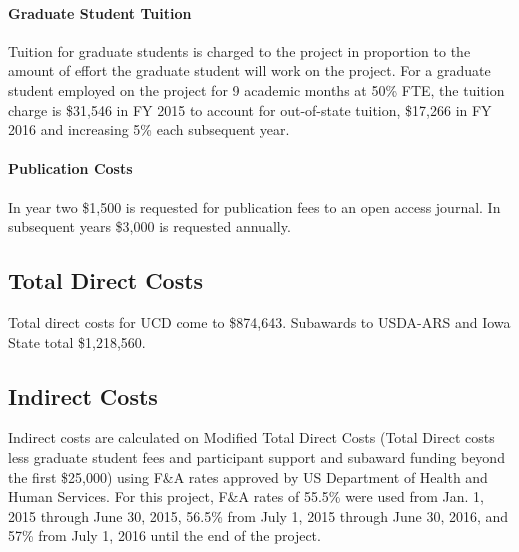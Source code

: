 \paragraph{Graduate Student Tuition}
Tuition for graduate students is charged to the project in proportion to the amount of effort the graduate student will work on the project. For a graduate student employed on the project for 9 academic months at 50\% FTE, the tuition charge is \$31,546 in FY 2015 to account for out-of-state tuition, \$17,266 in FY 2016 and increasing 5\% each subsequent year.

\paragraph{Publication Costs}
In year two \$1,500 is requested for publication fees to an open access journal.  In subsequent years \$3,000 is requested annually.

\subsection*{Total Direct Costs}

Total direct costs for UCD come to \$874,643.  Subawards to USDA-ARS and Iowa State total \$1,218,560.

\subsection*{Indirect Costs}
Indirect costs are calculated on Modified Total Direct Costs (Total Direct costs less graduate student fees and participant support and subaward funding beyond the first \$25,000) using F\&A rates approved by US Department of Health and Human Services. For this project, F\&A rates of 55.5\% were used from Jan. 1, 2015 through June 30, 2015, 56.5\% from July 1, 2015 through June 30, 2016, and 57\% from July 1, 2016 until the end of the project.



